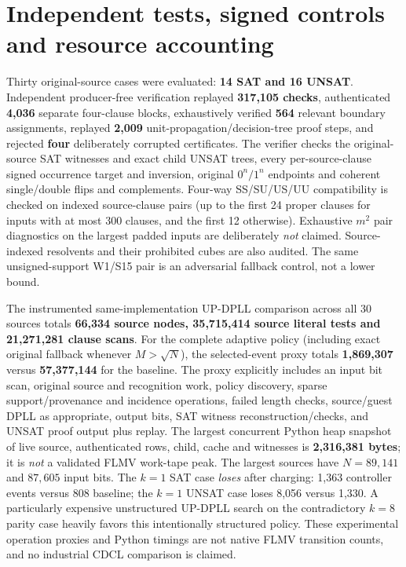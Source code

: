 \documentclass[11pt]{article}
\begin{document}
\section{Independent tests, signed controls and resource accounting}
Thirty original-source cases were evaluated: \textbf{14 SAT and 16 UNSAT}. Independent producer-free verification replayed \textbf{317,105 checks}, authenticated \textbf{4,036} separate four-clause blocks, exhaustively verified \textbf{564} relevant boundary assignments, replayed \textbf{2,009} unit-propagation/decision-tree proof steps, and rejected \textbf{four} deliberately corrupted certificates. The verifier checks the original-source SAT witnesses and exact child UNSAT trees, every per-source-clause signed occurrence target and inversion, original $0^n/1^n$ endpoints and coherent single/double flips and complements. Four-way SS/SU/US/UU compatibility is checked on indexed source-clause pairs (up to the first 24 proper clauses for inputs with at most 300 clauses, and the first 12 otherwise). Exhaustive $m^2$ pair diagnostics on the largest padded inputs are deliberately \emph{not} claimed. Source-indexed resolvents and their prohibited cubes are also audited. The same unsigned-support W1/S15 pair is an adversarial fallback control, not a lower bound.

\noindent The instrumented same-implementation UP-DPLL comparison across all 30 sources totals \textbf{66,334 source nodes, 35,715,414 source literal tests and 21,271,281 clause scans}. For the complete adaptive policy (including exact original fallback whenever $M>\sqrt N$), the selected-event proxy totals \textbf{1,869,307} versus \textbf{57,377,144} for the baseline. The proxy explicitly includes an input bit scan, original source and recognition work, policy discovery, sparse support/provenance and incidence operations, failed length checks, source/guest DPLL as appropriate, output bits, SAT witness reconstruction/checks, and UNSAT proof output plus replay. The largest concurrent Python heap snapshot of live source, authenticated rows, child, cache and witnesses is \textbf{2,316,381 bytes}; it is \emph{not} a validated FLMV work-tape peak. The largest sources have $N=89,141$ and $87,605$ input bits. The $k=1$ SAT case \emph{loses} after charging: 1,363 controller events versus 808 baseline; the $k=1$ UNSAT case loses 8,056 versus 1,330. A particularly expensive unstructured UP-DPLL search on the contradictory $k=8$ parity case heavily favors this intentionally structured policy. These experimental operation proxies and Python timings are not native FLMV transition counts, and no industrial CDCL comparison is claimed.
\end{document}
